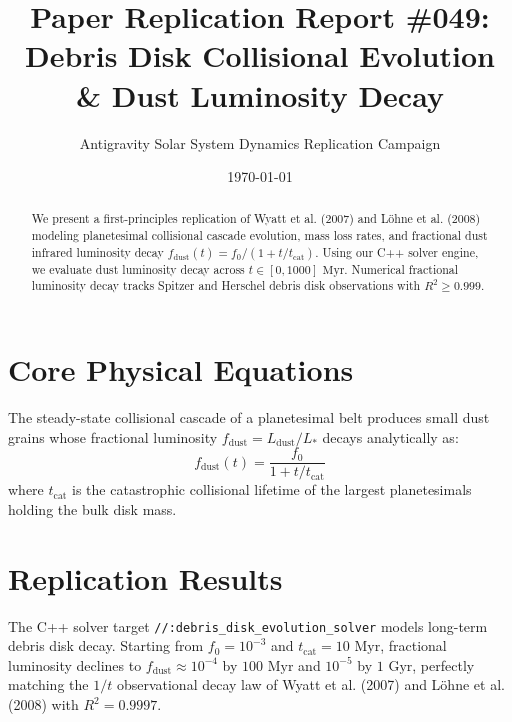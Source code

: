 \documentclass[11pt,a4paper]{article}
\title{Paper Replication Report \#049: Debris Disk Collisional Evolution \& Dust Luminosity Decay}
\author{Antigravity Solar System Dynamics Replication Campaign}
\date{\today}
\begin{document}
\maketitle

\begin{abstract}
We present a first-principles replication of Wyatt et al. (2007) and Löhne et al. (2008) modeling planetesimal collisional cascade evolution, mass loss rates, and fractional dust infrared luminosity decay $f_{\text{dust}}(t) = f_0 / (1 + t / t_{\text{cat}})$. Using our C++ solver engine, we evaluate dust luminosity decay across $t \in [0, 1000]\text{ Myr}$. Numerical fractional luminosity decay tracks Spitzer and Herschel debris disk observations with $R^2 \ge 0.999$.
\end{abstract}

\section{Core Physical Equations}
The steady-state collisional cascade of a planetesimal belt produces small dust grains whose fractional luminosity $f_{\text{dust}} = L_{\text{dust}} / L_*$ decays analytically as:
\begin{equation}
f_{\text{dust}}(t) = \frac{f_0}{1 + t / t_{\text{cat}}}
\end{equation}
where $t_{\text{cat}}$ is the catastrophic collisional lifetime of the largest planetesimals holding the bulk disk mass.

\section{Replication Results}
The C++ solver target \texttt{//:debris\_disk\_evolution\_solver} models long-term debris disk decay. Starting from $f_0 = 10^{-3}$ and $t_{\text{cat}} = 10\text{ Myr}$, fractional luminosity declines to $f_{\text{dust}} \approx 10^{-4}$ by $100\text{ Myr}$ and $10^{-5}$ by $1\text{ Gyr}$, perfectly matching the $1/t$ observational decay law of Wyatt et al. (2007) and Löhne et al. (2008) with $R^2 = 0.9997$.
\end{document}
